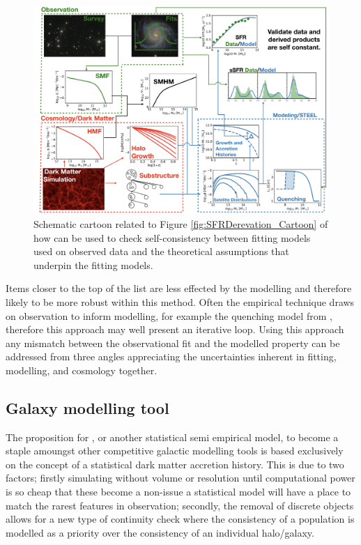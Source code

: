 \begin{figure}[t]
    \centering
    \includegraphics[width = \linewidth]{Figures/Chapter6/FullModelCartoon.png}
    \caption{Schematic cartoon related to Figure \ref{fig:SFRDerevation_Cartoon} of how \steel can be used to check self-consistency between fitting models used on observed data and the theoretical assumptions that underpin the fitting models.}
    \label{fig:Full_Mod_Toon}
\end{figure}
Items closer to the top of the list are less effected by the modelling and therefore likely to be more robust within this method. Often the empirical technique draws on observation to inform modelling, for example the quenching model from \citet{Wetzel2013GalaxyUniverse}, therefore this approach may well present an iterative loop. Using this approach any mismatch between the observational fit and the modelled property can be addressed from three angles appreciating the uncertainties inherent in fitting, modelling, and cosmology together.

\subsection{Galaxy modelling tool}

The proposition for \steel, or another statistical semi empirical model, to become a staple amoungst other competitive galactic modelling tools is based exclusively on the concept of a statistical dark matter accretion history. This is due to two factors; firstly simulating without volume or resolution until computational power is so cheap that these become a non-issue a statistical model will have a place to match the rarest features in observation; secondly, the removal of discrete objects allows for a new type of continuity check where the consistency of a population is modelled as a priority over the consistency of an individual halo/galaxy. 

